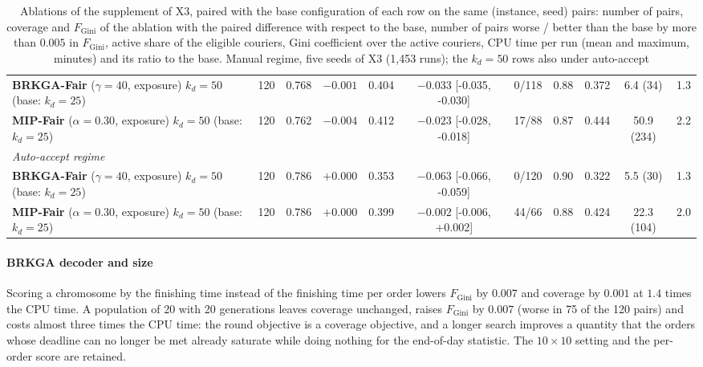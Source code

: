 \documentclass[a4paper,11pt,review,3p,authoryear]{elsarticle}
\newcommand{\FG}{F_{\text{Gini}}}
\begin{document}
\begin{table}
\begin{adjustbox}{max width=\textheight}
\begin{tabular}{l|c|cc|cc|c|c|c|c|c}
\textbf{BRKGA-Fair} ($\gamma = 40$, exposure) $k_d = 50$ (base: $k_d = 25$) & 120 & 0.768 & $-0.001$ & 0.404 & $-0.033$ [-0.035, -0.030] & 0/118 & 0.88 & 0.372 & 6.4 (34) & 1.3 \\
\textbf{MIP-Fair} ($\alpha = 0.30$, exposure) $k_d = 50$ (base: $k_d = 25$) & 120 & 0.762 & $-0.004$ & 0.412 & $-0.023$ [-0.028, -0.018] & 17/88 & 0.87 & 0.444 & 50.9 (234) & 2.2 \\
\hline
\multicolumn{11}{l}{\textit{Auto-accept regime}} \\
\textbf{BRKGA-Fair} ($\gamma = 40$, exposure) $k_d = 50$ (base: $k_d = 25$) & 120 & 0.786 & $+0.000$ & 0.353 & $-0.063$ [-0.066, -0.059] & 0/120 & 0.90 & 0.322 & 5.5 (30) & 1.3 \\
\textbf{MIP-Fair} ($\alpha = 0.30$, exposure) $k_d = 50$ (base: $k_d = 25$) & 120 & 0.786 & $+0.000$ & 0.399 & $-0.002$ [-0.006, +0.002] & 44/66 & 0.88 & 0.424 & 22.3 (104) & 2.0 \\
\hline
\end{tabular}
\end{adjustbox}
\caption{Ablations of the supplement of X3, paired with the base configuration of each row on the same (instance, seed) pairs: number of pairs, coverage and $\FG$ of the ablation with the paired difference with respect to the base, number of pairs worse / better than the base by more than $0.005$ in $\FG$, active share of the eligible couriers, Gini coefficient over the active couriers, CPU time per run (mean and maximum, minutes) and its ratio to the base. Manual regime, five seeds of X3 (1{,}453 runs); the $k_d = 50$ rows also under auto-accept}
\label{tab:ablations}
\end{table}

\paragraph{BRKGA decoder and size} Scoring a chromosome by the finishing time instead of the finishing time per order lowers $\FG$ by $0.007$ and coverage by $0.001$ at $1.4$ times the CPU time. A population of 20 with 20 generations leaves coverage unchanged, raises $\FG$ by $0.007$ (worse in 75 of the 120 pairs) and costs almost three times the CPU time: the round objective is a coverage objective, and a longer search improves a quantity that the orders whose deadline can no longer be met already saturate while doing nothing for the end-of-day statistic. The $10 \times 10$ setting and the per-order score are retained.
\end{document}
